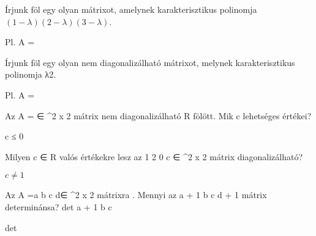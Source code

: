 \begin{frame}
  \begin{tcolorbox}[title={8/2. -N-}]
     Írjunk föl egy olyan mátrixot, amelynek karakterisztikus polinomja $(1−λ)(2−λ)(3−λ)$.

  \tcblower

    \mmedskip 
    
     Pl. A =
  \end{tcolorbox}
\end{frame}


\begin{frame}
  \begin{tcolorbox}[title={8/3. -R-}]
    Írjunk föl egy olyan nem diagonalizálható mátrixot, melynek karakterisztikus polinomja λ2.

  \tcblower

    \mmedskip 
    
    Pl. A =
  \end{tcolorbox}
\end{frame}


\begin{frame}
  \begin{tcolorbox}[title={8/4. -Q-}]
    Az A =  ∈ ^{2 x 2} mátrix nem diagonalizálható R fölött. Mik c lehetséges értékei?


  \tcblower

    \mmedskip 
    
    c ≤ 0
  \end{tcolorbox}
\end{frame}


\begin{frame}
  \begin{tcolorbox}[title={8/5. -Q-}]
    Milyen c ∈ R valós értékekre lesz az 1 2 0 c ∈ ^{2 x 2} mátrix diagonalizálható?

  \tcblower

    \mmedskip 
    
     $c \neq 1$
  \end{tcolorbox}
\end{frame}


\begin{frame}
  \begin{tcolorbox}[title={8/6. -Q-}]
     Az A =a b c d∈ ^{2 x 2} mátrixra . Mennyi az a + 1 b c d + 1 mátrix determinánsa? det a + 1 b c 

  \tcblower

    \mmedskip 
    
     det
  \end{tcolorbox}
\end{frame}


